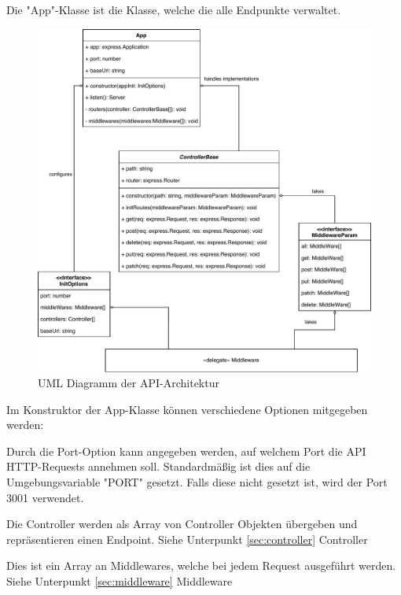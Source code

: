 \label{sec:app}

Die "App"-Klasse ist die Klasse, welche die alle Endpunkte verwaltet.  

\begin{figure}[H]
    \centering
    \includegraphics[width=\textwidth]{media/APITemplate/apiArchitecture.svg.pdf}
    \caption{UML Diagramm der API-Architektur}
    \label{fig:apiUML}
\end{figure}

Im Konstruktor der App-Klasse können verschiedene Optionen mitgegeben werden:


Durch die Port-Option kann angegeben werden, auf welchem Port die API HTTP-Requests annehmen soll. Standardmäßig ist dies auf die Umgebungsvariable "PORT" gesetzt. Falls diese nicht gesetzt ist, wird der Port 3001 verwendet.


Die Controller werden als Array von Controller Objekten übergeben und repräsentieren einen Endpoint. Siehe Unterpunkt \ref{sec:controller} Controller


Dies ist ein Array an Middlewares, welche bei jedem Request ausgeführt werden. Siehe Unterpunkt \ref{sec:middleware} Middleware

